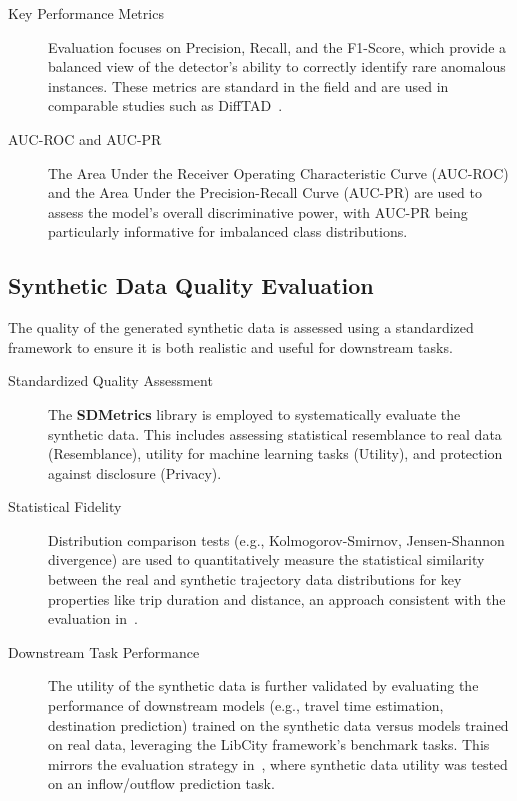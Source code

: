 \documentclass[runningheads]{llncs}
\begin{document}
\begin{description}
    \item[Key Performance Metrics] Evaluation focuses on Precision, Recall, and the F1-Score, which provide a balanced view of the detector's ability to correctly identify rare anomalous instances. These metrics are standard in the field and are used in comparable studies such as DiffTAD~\cite{liDiffTADDenoisingDiffusion2024}.
    \item[AUC-ROC and AUC-PR] The Area Under the Receiver Operating Characteristic Curve (AUC-ROC) and the Area Under the Precision-Recall Curve (AUC-PR) are used to assess the model's overall discriminative power, with AUC-PR being particularly informative for imbalanced class distributions.
\end{description}

\subsection{Synthetic Data Quality Evaluation}
\label{sec:synthetic-eval}

The quality of the generated synthetic data is assessed using a standardized framework to ensure it is both realistic and useful for downstream tasks.

\begin{description}
    \item[Standardized Quality Assessment] The \textbf{SDMetrics} library is employed to systematically evaluate the synthetic data. This includes assessing statistical resemblance to real data (Resemblance), utility for machine learning tasks (Utility), and protection against disclosure (Privacy).
    \item[Statistical Fidelity] Distribution comparison tests (e.g., Kolmogorov-Smirnov, Jensen-Shannon divergence) are used to quantitatively measure the statistical similarity between the real and synthetic trajectory data distributions for key properties like trip duration and distance, an approach consistent with the evaluation in~\cite{zhuDiffTrajGeneratingGPS2023}.
    \item[Downstream Task Performance] The utility of the synthetic data is further validated by evaluating the performance of downstream models (e.g., travel time estimation, destination prediction) trained on the synthetic data versus models trained on real data, leveraging the LibCity framework's benchmark tasks. This mirrors the evaluation strategy in~\cite{zhuDiffTrajGeneratingGPS2023}, where synthetic data utility was tested on an inflow/outflow prediction task.
\end{description}
\end{document}
